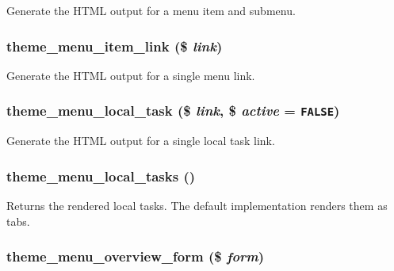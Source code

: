 Generate the HTML output for a menu item and submenu. \hypertarget{group__themeable_g77f59240b3aead5df8a777e4f69961b5}{
\subsubsection[{theme\_\-menu\_\-item\_\-link}]{\setlength{\rightskip}{0pt plus 5cm}theme\_\-menu\_\-item\_\-link (\$ {\em link})}}
\label{group__themeable_g77f59240b3aead5df8a777e4f69961b5}


Generate the HTML output for a single menu link. \hypertarget{group__themeable_gea1a8b949266dc4264f73d64bb0a8ecd}{
\subsubsection[{theme\_\-menu\_\-local\_\-task}]{\setlength{\rightskip}{0pt plus 5cm}theme\_\-menu\_\-local\_\-task (\$ {\em link}, \/  \$ {\em active} = {\tt FALSE})}}
\label{group__themeable_gea1a8b949266dc4264f73d64bb0a8ecd}


Generate the HTML output for a single local task link. \hypertarget{group__themeable_g11a9f127932a0b272cc0c0dabb4e7d0b}{
\subsubsection[{theme\_\-menu\_\-local\_\-tasks}]{\setlength{\rightskip}{0pt plus 5cm}theme\_\-menu\_\-local\_\-tasks ()}}
\label{group__themeable_g11a9f127932a0b272cc0c0dabb4e7d0b}


Returns the rendered local tasks. The default implementation renders them as tabs. \hypertarget{group__themeable_g4af0d13e1a7fdd7c08283101bbed6d2c}{
\subsubsection[{theme\_\-menu\_\-overview\_\-form}]{\setlength{\rightskip}{0pt plus 5cm}theme\_\-menu\_\-overview\_\-form (\$ {\em form})}}
\label{group__themeable_g4af0d13e1a7fdd7c08283101bbed6d2c}


